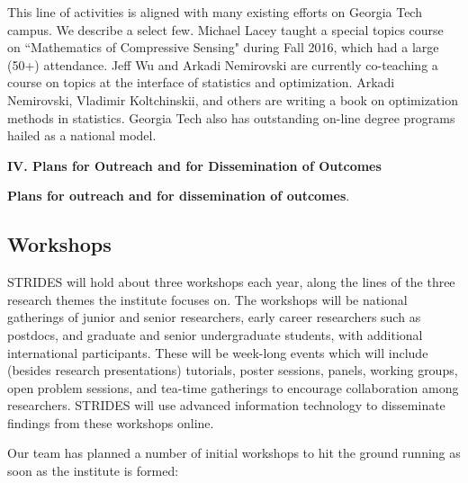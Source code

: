 \documentclass[12pt]{article}
\begin{document}
This line of activities is aligned with many existing efforts on Georgia Tech campus.
We describe a select few.
Michael Lacey taught a special topics course on
``Mathematics of Compressive Sensing" during  Fall 2016, which had a large (50+) attendance.
Jeff Wu and Arkadi Nemirovski are currently co-teaching a course  on topics at the interface of statistics and optimization.
Arkadi Nemirovski, Vladimir Koltchinskii, and others are writing a book on optimization methods in statistics. Georgia Tech also has outstanding on-line degree programs hailed as
a national model.


\clearpage

\begin{center}
{\bf\large IV. Plans for Outreach and for Dissemination of Outcomes}
\end{center}

{\bf Plans for outreach and for dissemination of outcomes}.

\subsection{Workshops}
\label{sec:workshops}
STRIDES will hold about three workshops each year, along the lines of the three research
themes the institute focuses on. The workshops will be national gatherings of junior and senior researchers, early career researchers such as postdocs, and graduate and senior
undergraduate students, with additional international participants.
These will be week-long events which will include (besides research presentations)
tutorials, poster sessions, panels, working groups, open problem sessions, and
tea-time gatherings to encourage collaboration among researchers.
STRIDES will use advanced information technology to disseminate findings from these workshops online.

Our team has planned a number of initial workshops to hit the ground running as soon as the
institute is formed:
\end{document}
